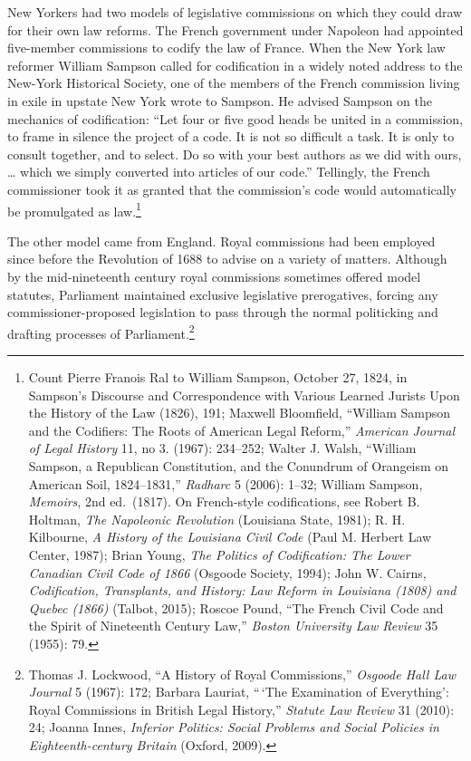 \documentclass[12pt,]{article}
\let\rmarkdownfootnote\footnote%
\def\footnote{\protect\rmarkdownfootnote}
\begin{document}
New Yorkers had two models of legislative commissions on which they
could draw for their own law reforms. The French government under
Napoleon had appointed five-member commissions to codify the law of
France. When the New York law reformer William Sampson called for
codification in a widely noted address to the New-York Historical
Society, one of the members of the French commission living in exile in
upstate New York wrote to Sampson. He advised Sampson on the mechanics
of codification: ``Let four or five good heads be united in a
commission, to frame in silence the project of a code. It is not so
difficult a task. It is only to consult together, and to select. Do so
with your best authors as we did with ours, \ldots{} which we simply
converted into articles of our code.'' Tellingly, the French
commissioner took it as granted that the commission's code would
automatically be promulgated as law.\footnote{Count Pierre Franois Ral
  to William Sampson, October 27, 1824, in Sampson's Discourse and
  Correspondence with Various Learned Jurists Upon the History of the
  Law (1826), 191; Maxwell Bloomfield, ``William Sampson and the
  Codifiers: The Roots of American Legal Reform,'' \emph{American
  Journal of Legal History} 11, no 3. (1967): 234--252; Walter J. Walsh,
  ``William Sampson, a Republican Constitution, and the Conundrum of
  Orangeism on American Soil, 1824--1831,'' \emph{Radharc} 5 (2006):
  1--32; William Sampson, \emph{Memoirs}, 2nd ed.~(1817). On
  French-style codifications, see Robert B. Holtman, \emph{The
  Napoleonic Revolution} (Louisiana State, 1981); R. H. Kilbourne,
  \emph{A History of the Louisiana Civil Code} (Paul M. Herbert Law
  Center, 1987); Brian Young, \emph{The Politics of Codification: The
  Lower Canadian Civil Code of 1866} (Osgoode Society, 1994); John W.
  Cairns, \emph{Codification, Transplants, and History: Law Reform in
  Louisiana (1808) and Quebec (1866)} (Talbot, 2015); Roscoe Pound,
  ``The French Civil Code and the Spirit of Nineteenth Century Law,''
  \emph{Boston University Law Review} 35 (1955): 79.}

The other model came from England. Royal commissions had been employed
since before the Revolution of 1688 to advise on a variety of matters.
Although by the mid-nineteenth century royal commissions sometimes
offered model statutes, Parliament maintained exclusive legislative
prerogatives, forcing any commissioner-proposed legislation to pass
through the normal politicking and drafting processes of
Parliament.\footnote{Thomas J. Lockwood, ``A History of Royal
  Commissions,'' \emph{Osgoode Hall Law Journal} 5 (1967): 172; Barbara
  Lauriat, ``\,`The Examination of Everything': Royal Commissions in
  British Legal History,'' \emph{Statute Law Review} 31 (2010): 24;
  Joanna Innes, \emph{Inferior Politics: Social Problems and Social
  Policies in Eighteenth-century Britain} (Oxford, 2009).}
\end{document}
